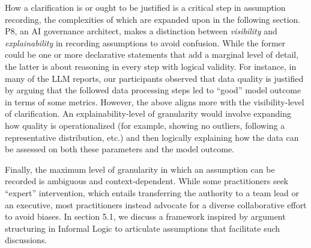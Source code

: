 How a clarification is or ought to be justified is a critical step in assumption recording, the complexities of which are expanded upon in the following section. P8, an AI governance architect, makes a distinction between \textit{visibility} and \textit{explainability} in recording assumptions to avoid confusion. While the former could be one or more declarative statements that add a marginal level of detail, the latter is about reasoning in every step with logical validity. For instance, in many of the LLM reports, our participants observed that data quality is justified by arguing that the followed data processing steps led to ``good'' model outcome in terms of some metrics. However, the above aligns more with the visibility-level of clarification. An explainability-level of granularity would involve expanding how quality is operationalized (for example, showing no outliers, following a representative distribution, etc.) and then logically explaining how the data can be assessed on both these parameters and the model outcome.

Finally, the maximum level of granularity in which an assumption can be recorded is ambiguous and context-dependent. While some practitioners seek ``expert'' intervention, which entails transferring the authority to a team lead or an executive, most practitioners instead advocate for a diverse collaborative effort to avoid biases. In section 5.1, we discuss a framework inspired by argument structuring in Informal Logic to articulate assumptions that facilitate such discussions.


